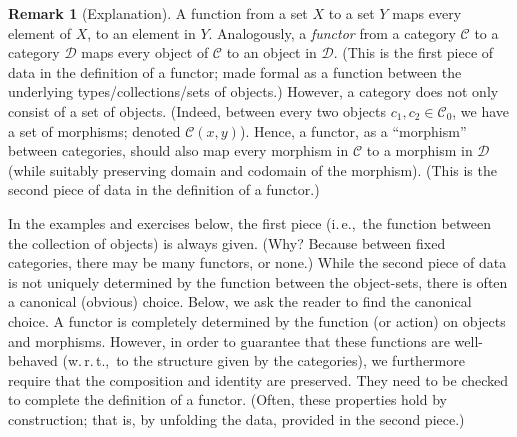 \documentclass[a4paper,11pt, oneside,titlepage=false]{scrbook}
\theoremstyle{plain}
\theoremstyle{definition}
\newtheorem{rem}[thm]{Remark}
\newcommand{\Cat}[1]{\mathcal{#1}}
\newcommand{\CC}{\Cat{C}}
\newcommand{\DD}{\Cat{D}}
\newcommand{\Ob}[1]{{#1}_0}
\newcommand{\CHom}[3]{{#1}(#2,#3)}
\begin{document}
\begin{rem}[Explanation]
	A function from a set $X$ to a set $Y$ maps every element of $X$, to an element in $Y$.
	Analogously, a \emph{functor} from a category $\CC$ to a category $\DD$ maps every object of $\CC$ to an object in $\DD$.
	(This is the first piece of data in the definition of a functor; made formal as a function between the underlying types/collections/sets of objects.)
	However, a category does not only consist of a set of objects.
	(Indeed, between every two objects $c_1, c_2 \in \Ob{\CC}$, we have a set of morphisms; denoted $\CHom{\CC}{x}{y}$).
	Hence, a functor, as a ``morphism'' between categories, should also map every morphism in $\CC$ to a morphism in $\DD$ (while suitably preserving domain and codomain of the morphism).
	(This is the second piece of data in the definition of a functor.)
	
	In the examples and exercises below, the first piece (i.\,e.,\, the function between the collection of objects) is always given.
	(Why? Because between fixed categories, there may be many functors, or none.)
	While the second piece of data is not uniquely determined by the function between the object-sets, there is often a canonical (obvious) choice.
	Below, we ask the reader to find the canonical choice.
	A functor is completely determined by the function (or action) on objects and morphisms.
	However, in order to guarantee that these functions are well-behaved (w.\,r.\,t.,\, to the structure given by the categories), we furthermore require that the composition and identity are preserved.
They need to be checked to complete the definition of a functor.
	(Often, these properties hold by construction; that is, by unfolding the data, provided in the second piece.)
\end{rem}
\end{document}
